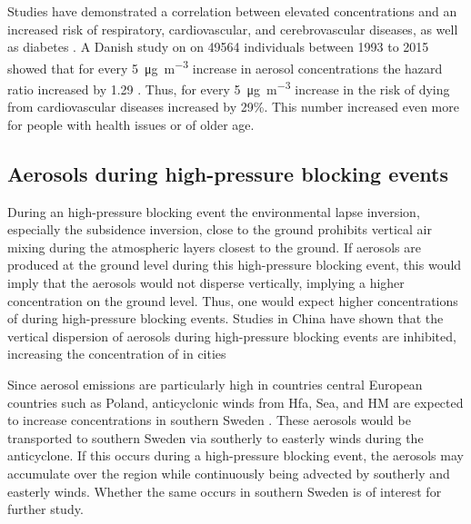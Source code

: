Studies have demonstrated a correlation between elevated \PM concentrations and an increased risk of respiratory, cardiovascular, and cerebrovascular diseases, as well as diabetes \cite{sharmaHealthEffectsAssociated2020}. A Danish study on on \SI{49564}{} individuals between 1993 to 2015 showed that for every \SI{5}{\micro\gram\per
\m\cubed} increase in aerosol concentrations the hazard ratio increased by 1.29 \cite{hvidtfeldtLongtermResidentialExposure2019}. Thus, for every \SI{5}{\micro\gram\per
\m\cubed} increase in \PM the risk of dying from cardiovascular diseases increased by 29\%. This number increased even more for people with health issues or of older age.  

\subsection{Aerosols during high-pressure blocking events}
During an high-pressure blocking event the environmental lapse inversion, especially the subsidence inversion, close to the ground prohibits vertical air mixing during the atmospheric layers closest to the ground. If aerosols are produced at the ground level during this high-pressure blocking event, this would imply that the aerosols would not disperse vertically, implying a higher concentration on the ground level. Thus, one would expect higher concentrations of \PM during high-pressure blocking events. Studies in China have shown that the vertical dispersion of aerosols during high-pressure blocking events are inhibited, increasing the concentration of \PM in cities \cite{caiImpactBlockingStructure2020}

Since aerosol emissions are particularly high in countries central European countries such as Poland, anticyclonic winds from Hfa, Sea, and HM are expected to increase \PM  concentrations in southern Sweden \cite{europeanenvironmentagencyEuropesAirQuality2024}. These aerosols would be transported to southern Sweden via southerly to easterly winds during the anticyclone. If this occurs during a high-pressure blocking event, the aerosols may accumulate over the region while continuously being advected by southerly and easterly winds. Whether the same occurs in southern Sweden is of interest for further study.